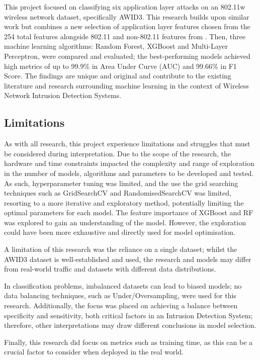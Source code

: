 This project focused on classifying six application layer attacks on an 802.11w wireless network dataset, specifically AWID3. This research builds upon similar work but combines a new selection of application layer features chosen from the 254 total features alongside 802.11 and non-802.11 features from \parencite{s22155633}. Then, three machine learning algorithms: Random Forest, XGBoost and Multi-Layer Perceptron, were compared and evaluated; the best-performing models achieved high metrics of up to 99.9\% in Area Under Curve (AUC) and 99.66\% in F1 Score. The findings are unique and original and contribute to the existing literature and research surrounding machine learning in the context of Wireless Network Intrusion Detection Systems.


\subsection{Limitations}

As with all research, this project experience limitations and struggles that must be considered during interpretation. Due to the scope of the research, the hardware and time constraints impacted the complexity and range of exploration in the number of models, algorithms and parameters to be developed and tested. As such, hyperparameter tuning was limited, and the use the grid searching techniques such as GridSearchCV and RandomisedSearchCV was limited, resorting to a more iterative and exploratory method, potentially limiting the optimal parameters for each model. The feature importance of XGBoost and RF was explored to gain an understanding of the model. However, the exploration could have been more exhaustive and directly used for model optimisation.

A limitation of this research was the reliance on a single dataset; whilst the AWID3 dataset is well-established and used, the research and models may differ from real-world traffic and datasets with different data distributions.

In classification problems, imbalanced datasets can lead to biased models; no data balancing techniques, such as Under/Oversampling, were used for this research. Additionally, the focus was placed on achieving a balance between specificity and sensitivity, both critical factors in an Intrusion Detection System; therefore, other interpretations may draw different conclusions in model selection.

Finally, this research did focus on metrics such as training time, as this can be a crucial factor to consider when deployed in the real world.


